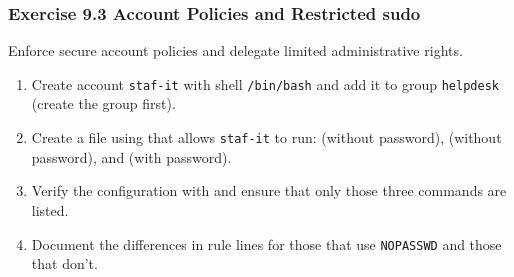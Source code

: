 \subsubsection*{Exercise 9.3 Account Policies and Restricted sudo}
Enforce secure account policies and delegate limited administrative rights.
\begin{enumerate}
\item Create account \texttt{staf-it} with shell \texttt{/bin/bash} and add it to group \texttt{helpdesk} (create the group first).
\item Create a file  using  that allows \texttt{staf-it} to run:  (without password),  (without password), and  (with password).
\item Verify the configuration with  and ensure that only those three commands are listed.
\item Document the differences in rule lines for those that use \texttt{NOPASSWD} and those that don't.
\end{enumerate}


